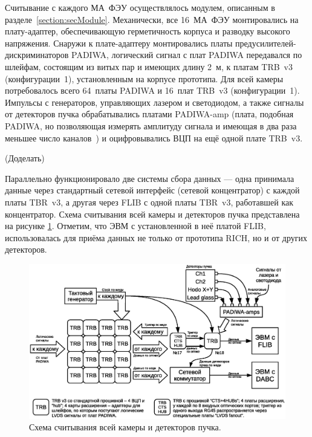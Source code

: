 Считывание с каждого МА~ФЭУ осуществлялось модулем, описанным в разделе~\ref{section:secModule}. Механически, все 16~МА~ФЭУ монтировались на плату-адаптер, обеспечивающую герметичность корпуса и разводку высокого напряжения. Снаружи к плате-адаптеру монтировались платы предусилителей-дискриминаторов PADIWA, логический сигнал с плат PADIWA передавался по шлейфам, состоящим из витых пар и имеющих длину 2~м, к платам TRB~v3 (конфигурации~1), установленным на корпусе прототипа. Для всей камеры потребовалось всего 64~платы PADIWA и 16~плат TRB~v3 (конфигурации~1). Импульсы с генераторов, управляющих лазером и светодиодом, а также сигналы от детекторов пучка обрабатывались платами PADIWA-amp (плата, подобная PADIWA, но позволяющая измерять амплитуду сигнала и имеющая в два раза меньшее число каналов~\cite{}) и оцифровывались ВЦП на ещё одной плате TRB~v3.

(Доделать)

Параллельно функционировало две системы сбора данных --- одна принимала данные через стандартный сетевой интерфейс (сетевой концентратор) с каждой платы TBR~v3, а другая через FLIB с одной платы TBR~v3, работавшей как концентратор. Схема считывания всей камеры и детекторов пучка представлена на рисунке \ref{fig:BeamtimeReadout}. Отметим, что ЭВМ с установленной в неё платой FLIB, использовалась для приёма данных не только от прототипа RICH, но и от других детекторов.

\begin{figure}
\includegraphics[width=1.0\textwidth]{pictures/11_Beamtime_readout_chain.eps}
\caption{Схема считывания всей камеры и детекторов пучка.}
\label{fig:BeamtimeReadout}
\end{figure}
